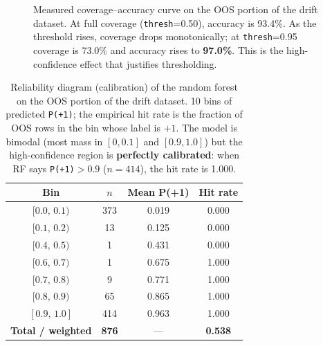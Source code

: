 \documentclass[11pt,a4paper]{article}
\providecommand{\rf}{\textsc{Rf}}
\begin{document}
\begin{figure}[htbp]
\centering
{}
\caption{Measured coverage--accuracy curve on the OOS
portion of the drift dataset. At full coverage
(\texttt{thresh}=0.50), accuracy is 93.4\%. As the
threshold rises, coverage drops monotonically; at
\texttt{thresh}=0.95 coverage is 73.0\% and accuracy rises
to \textbf{97.0\%}. This is the high-confidence effect
that justifies thresholding.}
\label{fig:coverage}
\end{figure}

\begin{table}[htbp]
\centering
\small
\caption{Reliability diagram (calibration) of the random
forest on the OOS portion of the drift dataset. 10 bins
of predicted \texttt{P(+1)}; the empirical hit rate is
the fraction of OOS rows in the bin whose label is $+1$.
The model is bimodal (most mass in $[0,0.1]$ and
$[0.9,1.0]$) but the high-confidence region is
\textbf{perfectly calibrated}: when RF says
\texttt{P(+1)}$>0.9$ ($n=414$), the hit rate is 1.000.}
\label{tab:cal}
\begin{tabular}{@{}cccc@{}}
\toprule
\textbf{Bin} & \textbf{$n$} & \textbf{Mean P(+1)} & \textbf{Hit rate}\\
\midrule
$[0.0,\,0.1)$ & 373 & 0.019 & 0.000\\
$[0.1,\,0.2)$ &  13 & 0.125 & 0.000\\
$[0.4,\,0.5)$ &   1 & 0.431 & 0.000\\
$[0.6,\,0.7)$ &   1 & 0.675 & 1.000\\
$[0.7,\,0.8)$ &   9 & 0.771 & 1.000\\
$[0.8,\,0.9)$ &  65 & 0.865 & 1.000\\
$[0.9,\,1.0]$ & 414 & 0.963 & 1.000\\
\midrule
\textbf{Total / weighted} & \textbf{876} & --- & \textbf{0.538}\\
\bottomrule
\end{tabular}
\end{table}
\end{document}
